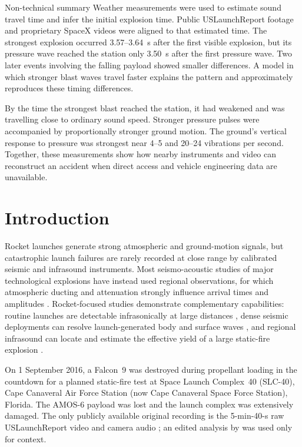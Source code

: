 \documentclass[]{seismica}
\begin{document}
{\begin{summary}{Non-technical summary}
  Weather measurements were used to estimate sound travel time and infer
  the initial explosion time. Public USLaunchReport footage and proprietary
  SpaceX videos were aligned to that estimated time. The strongest explosion
  occurred 3.57--3.64~s after the first visible explosion, but its pressure
  wave reached the station only 3.50~s after the first pressure wave.
  Two later events involving the falling payload showed smaller differences.
  A model in which stronger blast waves travel faster explains the pattern
  and approximately reproduces these timing differences.

  By the time the strongest blast reached the station, it had weakened
  and was travelling close to ordinary sound speed. Stronger pressure pulses
  were accompanied by proportionally stronger ground motion. The ground's
  vertical response to pressure was strongest near 4--5 and 20--24
  vibrations per second. Together, these measurements show how nearby
  instruments and video can reconstruct an accident when direct access
  and vehicle engineering data are unavailable.
  \end{summary}
}

\section{Introduction}
\label{sec:introduction}

Rocket launches generate strong atmospheric and ground-motion signals, but
catastrophic launch failures are rarely recorded at close range by calibrated
seismic and infrasound instruments. Most seismo-acoustic studies of major
technological explosions have instead used regional observations, for which
atmospheric ducting and attenuation strongly influence arrival times and
amplitudes \citep{ottemoller_2008,green_2008,ceranna_2009,smink_2019,
pilger_beirut_2021,kim_pasyanos_2022}. Rocket-focused studies demonstrate
complementary capabilities: routine launches are detectable infrasonically at
large distances \citep{pilger_rocket_2021}, dense seismic deployments can
resolve launch-generated body and surface waves
\citep{schuster_rocketquake_2025}, and regional infrasound can locate and
estimate the effective yield of a large static-fire explosion
\citep{silber_scamfer_newglenn_2026}.

On 1 September 2016, a Falcon~9 was destroyed during propellant loading in the
countdown for a planned static-fire test at Space Launch Complex~40 (SLC-40),
Cape Canaveral Air Force Station (now Cape Canaveral Space Force Station), Florida. The AMOS-6 payload was lost and 
the launch complex was extensively damaged. The only publicly available original 
recording is the 5-min-40-s raw USLaunchReport video and camera audio 
\citep{uslaunchreport_amos6_video_2016}; an edited analysis by 
\citet{manley_spacex_explosion_2016} was used only for context. 
\end{document}
